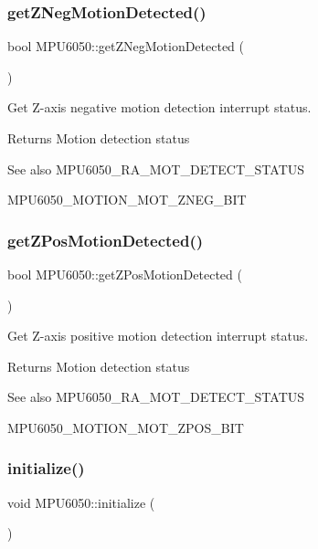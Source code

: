 \subsubsection{\texorpdfstring{getZNegMotionDetected()}{getZNegMotionDetected()}}
{\footnotesize\ttfamily bool M\+P\+U6050\+::get\+Z\+Neg\+Motion\+Detected (\begin{DoxyParamCaption}{ }\end{DoxyParamCaption})}

Get Z-\/axis negative motion detection interrupt status. \begin{DoxyReturn}{Returns}
Motion detection status 
\end{DoxyReturn}
\begin{DoxySeeAlso}{See also}
M\+P\+U6050\+\_\+\+R\+A\+\_\+\+M\+O\+T\+\_\+\+D\+E\+T\+E\+C\+T\+\_\+\+S\+T\+A\+T\+US 

M\+P\+U6050\+\_\+\+M\+O\+T\+I\+O\+N\+\_\+\+M\+O\+T\+\_\+\+Z\+N\+E\+G\+\_\+\+B\+IT 
\end{DoxySeeAlso}
\mbox{\label{class_m_p_u6050_a33c766cd415fc5780417b1ed76717875}} 
\subsubsection{\texorpdfstring{getZPosMotionDetected()}{getZPosMotionDetected()}}
{\footnotesize\ttfamily bool M\+P\+U6050\+::get\+Z\+Pos\+Motion\+Detected (\begin{DoxyParamCaption}{ }\end{DoxyParamCaption})}

Get Z-\/axis positive motion detection interrupt status. \begin{DoxyReturn}{Returns}
Motion detection status 
\end{DoxyReturn}
\begin{DoxySeeAlso}{See also}
M\+P\+U6050\+\_\+\+R\+A\+\_\+\+M\+O\+T\+\_\+\+D\+E\+T\+E\+C\+T\+\_\+\+S\+T\+A\+T\+US 

M\+P\+U6050\+\_\+\+M\+O\+T\+I\+O\+N\+\_\+\+M\+O\+T\+\_\+\+Z\+P\+O\+S\+\_\+\+B\+IT 
\end{DoxySeeAlso}
\mbox{\label{class_m_p_u6050_abd8fc6c18adf158011118fbccc7e7054}} 
\subsubsection{\texorpdfstring{initialize()}{initialize()}}
{\footnotesize\ttfamily void M\+P\+U6050\+::initialize (\begin{DoxyParamCaption}{ }\end{DoxyParamCaption})}

